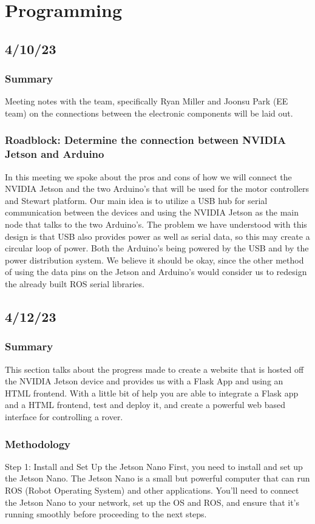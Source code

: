 \documentclass[a4paper, 10pt]{article}
\begin{document}
\section{Programming}
    \subsection{4/10/23}
        \subsubsection{Summary}
        Meeting notes with the team, specifically Ryan Miller and Joonsu Park (EE team) on the connections between the electronic components will be laid out.

        \subsubsection{Roadblock: Determine the connection between NVIDIA Jetson and Arduino}
        In this meeting we spoke about the pros and cons of how we will connect the NVIDIA Jetson and the two Arduino's that will be used for the motor controllers and Stewart platform. Our main idea is to utilize a USB hub for serial communication between the devices and using the NVIDIA Jetson as the main node that talks to the two Arduino's. The problem we have understood with this design is that USB also provides power as well as serial data, so this may create a circular loop of power. Both the Arduino's being powered by the USB and by the power distribution system. We believe it should be okay, since the other method of using the data pins on the Jetson and Arduino's would consider us to redesign the already built ROS serial libraries. 
    \subsection{4/12/23}
        \subsubsection{Summary}
        This section talks about the progress made to create a website that is hosted off the NVIDIA Jetson device and provides us with a Flask App and using an HTML frontend. With a little bit of help you are able to integrate a Flask app and a HTML frontend, test and deploy it, and create a powerful web based interface for controlling a rover.

        \subsubsection{Methodology}
        Step 1: Install and Set Up the Jetson Nano
        First, you need to install and set up the Jetson Nano. The Jetson Nano is a small but powerful computer that can run ROS (Robot Operating System) and other applications. You'll need to connect the Jetson Nano to your network, set up the OS and ROS, and ensure that it's running smoothly before proceeding to the next steps.
        
\end{document}
